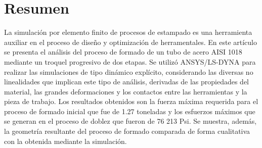 \chapter*{Resumen}


La simulación por elemento finito de procesos de estampado es una herramienta auxiliar en el proceso de diseño y optimización de herramentales. En este artículo se presenta el análisis del proceso de formado de un tubo de acero AISI 1018 mediante un troquel progresivo de dos etapas. Se utilizó ANSYS/LS-DYNA para realizar las simulaciones de tipo dinámico explícito, considerando las diversas no linealidades que implican este tipo de análisis, derivadas de las propiedades del material, las grandes deformaciones y los contactos entre las herramientas y la pieza de trabajo. Los resultados obtenidos son la fuerza máxima requerida para el proceso de formado inicial que fue de 1.27 toneladas y los esfuerzos máximos que se generan en el proceso de doblez que fueron de 76 213 Psi. Se muestra, además, la geometría resultante del proceso de formado comparada de forma cualitativa con la obtenida mediante la simulación.